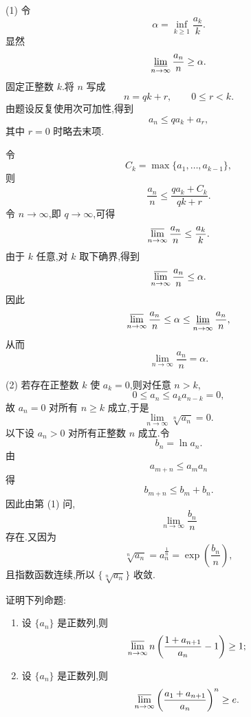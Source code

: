 \exampleblank

\begin{solution}

  (1) 令
  \[
    \alpha=\inf\limits_{k\geq 1}\dfrac{a_k}{k}.
  \]
  显然
  \[
    \varliminf\limits_{n\to\infty}\dfrac{a_n}{n}\geq\alpha.
  \]
  固定正整数 $k$.将 $n$ 写成
  \[
    n=qk+r,\qquad 0\leq r<k.
  \]
  由题设反复使用次可加性,得到
  \[
    a_n\leq qa_k+a_r,
  \]
  其中 $r=0$ 时略去末项.

  令
  \[
    C_k=\max\{a_1,\ldots,a_{k-1}\},
  \]
  则
  \[
    \dfrac{a_n}{n}
    \leq
    \dfrac{qa_k+C_k}{qk+r}.
  \]
  令 $n\to\infty$,即 $q\to\infty$,可得
  \[
    \varlimsup\limits_{n\to\infty}\dfrac{a_n}{n}
    \leq
    \dfrac{a_k}{k}.
  \]
  由于 $k$ 任意,对 $k$ 取下确界,得到
  \[
    \varlimsup\limits_{n\to\infty}\dfrac{a_n}{n}
    \leq\alpha.
  \]
  因此
  \[
    \varlimsup\limits_{n\to\infty}\dfrac{a_n}{n}
    \leq
    \alpha
    \leq
    \varliminf\limits_{n\to\infty}\dfrac{a_n}{n},
  \]
  从而
  \[
    \displaystyle\lim\limits_{n\to\infty}\dfrac{a_n}{n}
    =\alpha.
  \]

  (2) 若存在正整数 $k$ 使 $a_k=0$,则对任意 $n>k$,
  \[
    0\leq a_n\leq a_k a_{n-k}=0,
  \]
  故 $a_n=0$ 对所有 $n\geq k$ 成立,于是
  \[
    \displaystyle\lim\limits_{n\to\infty}\sqrt[n]{a_n}=0.
  \]
  以下设 $a_n>0$ 对所有正整数 $n$ 成立.令
  \[
    b_n=\ln a_n.
  \]
  由
  \[
    a_{m+n}\leq a_m a_n
  \]
  得
  \[
    b_{m+n}\leq b_m+b_n.
  \]
  因此由第 (1) 问,
  \[
    \displaystyle\lim\limits_{n\to\infty}\dfrac{b_n}{n}
  \]
  存在.又因为
  \[
    \sqrt[n]{a_n}
    =a_n^{\frac{1}{n}}
    =\exp\left(\dfrac{b_n}{n}\right),
  \]
  且指数函数连续,所以 $\{\sqrt[n]{a_n}\}$ 收敛.

\end{solution}


\begin{example}

  证明下列命题:

  \begin{enumerate}

    \item 设 $\{a_n\}$ 是正数列,则
          \[
            \varlimsup\limits_{n\to\infty}
            n\left(\dfrac{1+a_{n+1}}{a_n}-1\right)
            \geq1;
          \]

    \item 设 $\{a_n\}$ 是正数列,则
          \[
            \varlimsup\limits_{n\to\infty}
            \left(\dfrac{a_1+a_{n+1}}{a_n}\right)^n
            \geq e.
          \]

  \end{enumerate}

\end{example}


